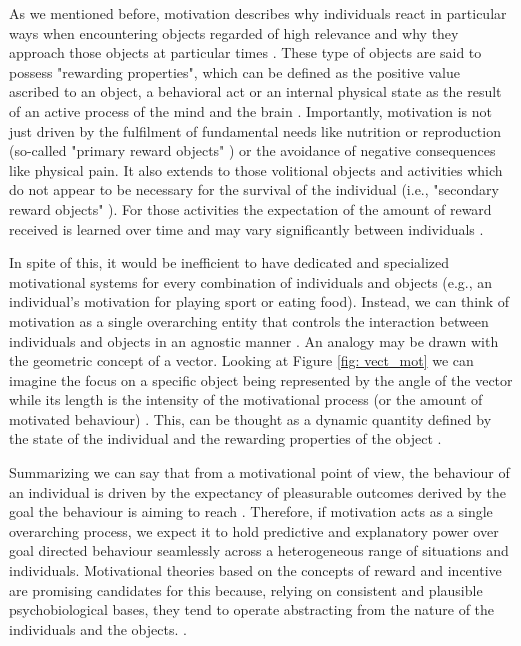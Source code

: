 As we mentioned before, motivation describes why individuals react in particular ways when encountering objects regarded of high relevance and why they approach those objects at particular times \cite{berridge2004motivation}. These type of objects are said to possess "rewarding properties", which can be defined as the positive value ascribed to an object, a behavioral act or an internal physical state as the result of an active process of the mind and the brain \cite{schultz1997neural,berridge2008affective}. Importantly, motivation is not just driven by the fulfilment of fundamental needs like nutrition or reproduction (so-called "primary reward objects" \cite{schultz2000reward}) or the avoidance of negative consequences like physical pain. It also extends to those volitional objects and activities which do not appear to be necessary for the survival of the individual (i.e., "secondary reward objects" \cite{berridge2008affective,sescousse2013processing}). For those activities the expectation of the amount of reward received is learned over time and may vary significantly between individuals \cite{berridge2008affective,simpson2016behavioral}. 

In spite of this, it would be inefficient to have dedicated and specialized motivational systems for every combination of individuals and objects (e.g., an individual's motivation for playing sport or eating food). Instead, we can think of motivation as a single overarching entity that controls the interaction between individuals and objects in an agnostic manner \cite{simpson2016behavioral}. An analogy may be drawn with the geometric concept of a vector. Looking at Figure \ref{fig: vect_mot} we can imagine the focus on a specific object being represented by the angle of the vector while its length is the intensity of the motivational process (or the amount of motivated behaviour) \cite{simpson2016behavioral}. This, can be thought as a dynamic quantity defined by the state of the individual and the rewarding properties of the object \cite{toates1994comparing,berridge2004motivation,zhang2009neural}.



Summarizing we can say that from a motivational point of view, the behaviour of an individual is driven by the expectancy of pleasurable outcomes derived by the goal the behaviour is aiming to reach \cite{berridge2004motivation}. Therefore, if motivation acts as a single overarching process, we expect it to hold predictive and explanatory power over goal directed behaviour seamlessly across a heterogeneous range of situations and individuals. Motivational theories based on the concepts of reward and incentive are promising candidates for this because, relying on consistent and plausible psychobiological bases, they tend to operate abstracting from the nature of the individuals and the objects. \cite{ikemoto1999role,berridge1998role,salamone2002motivational,berridge2004motivation,armony2013cambridge,corbit2015learning}.

